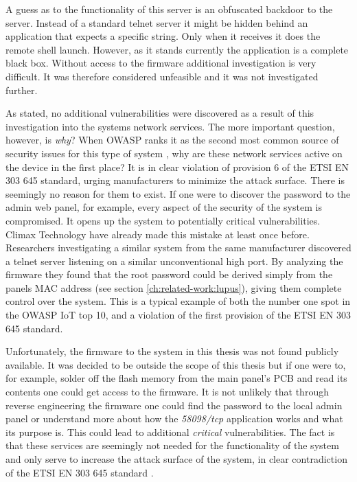 A guess as to the functionality of this server is an obfuscated backdoor to the server. Instead of a standard telnet server it might be hidden behind an application that expects a specific string. Only when it receives it does the remote shell launch. However, as it stands currently the application is a complete black box. Without access to the firmware additional investigation is very difficult. It was therefore considered unfeasible and it was not investigated further.

As stated, no additional vulnerabilities were discovered as a result of this investigation into the systems network services. The more important question, however, is \textit{why}? When OWASP ranks it as the second most common source of security issues for this type of system \cite{owasp-iot-top10}, why are these network services active on the device in the first place? It is in clear violation of provision 6 of the ETSI EN 303 645 standard, urging manufacturers to minimize the attack surface. There is seemingly no reason for them to exist. If one were to discover the password to the admin web panel, for example, every aspect of the security of the system is compromised. It opens up the system to potentially critical vulnerabilities. Climax Technology have already made this mistake at least once before. Researchers investigating a similar system from the same manufacturer discovered a telnet server listening on a similar unconventional high port. By analyzing the firmware they found that the root password could be derived simply from the panels MAC address \cite{labvienna} (see section \ref{ch:related-work:lupus}), giving them complete control over the system. This is a typical example of both the number one spot in the OWASP IoT top 10, and a violation of the first provision of the ETSI EN 303 645 standard.

Unfortunately, the firmware to the system in this thesis was not found publicly available. It was decided to be outside the scope of this thesis but if one were to, for example, solder off the flash memory from the main panel's PCB and read its contents one could get access to the firmware. It is not unlikely that through reverse engineering the firmware one could find the password to the local admin panel or understand more about how the \textit{58098/tcp} application works and what its purpose is. This could lead to additional \textit{critical} vulnerabilities. The fact is that these services are seemingly not needed for the functionality of the system and only serve to increase the attack surface of the system, in clear contradiction of the ETSI EN 303 645 standard \cite{etsi-iot-standard}.
